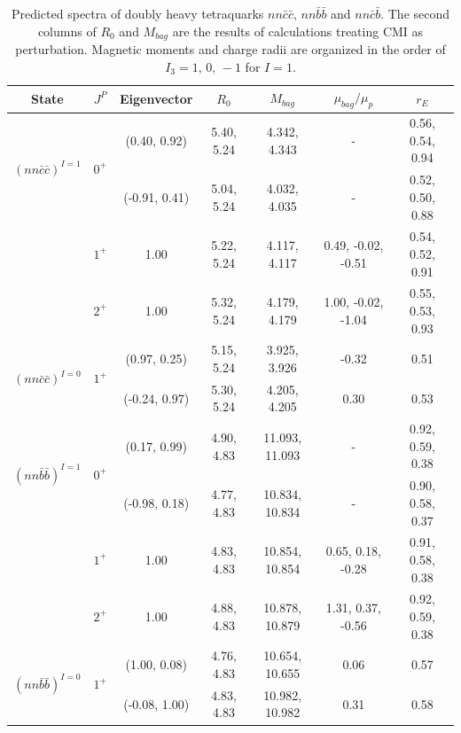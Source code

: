 \documentclass[prd,twocolumn,floatfix,nofootinbib]{revtex4}
\begin{document}
\renewcommand{\tabcolsep}{0.47cm}
\renewcommand{\arraystretch}{1.2}
\begin{table}[!htbp]
    \caption{Predicted spectra of doubly heavy tetraquarks $nn\bar{c}\bar{c}$, $nn\bar{b}\bar{b}$ and $nn\bar{c}\bar{b}$. 
    The second columns of $R_{0}$ and $M_{bag}$ are the results of calculations treating CMI as perturbation. 
    Magnetic moments and charge radii are organized in the order of $I_{3}=1,\,0,\,-1$ for $I=1$.}
    \label{tab:2heavytetraquark1}
    \begin{tabular}{ccccccc}
        \hline\hline
        {\rm State}     &$J^{P}$    &{\rm Eigenvector}      &$R_{0}$        &$M_{bag}$          &$\mu_{bag}/\mu_{p}$    &$r_{E}$ \\ \hline
        \multirow{2}{*}{${(nn\bar{c}\bar{c})}^{I=1}$}
                        &\multirow{2}{*}{$0^{+}$}
                                    &(0.40, 0.92)           &5.40, 5.24	    &4.342, 4.343	    &-                      &0.56, 0.54, 0.94 \\
                        &           &(-0.91, 0.41)          &5.04, 5.24	    &4.032, 4.035	    &-                      &0.52, 0.50, 0.88 \\
                        &$1^{+}$    &1.00                   &5.22, 5.24	    &4.117, 4.117	    &0.49, -0.02, -0.51     &0.54, 0.52, 0.91 \\
                        &$2^{+}$    &1.00                   &5.32, 5.24	    &4.179, 4.179	    &1.00, -0.02, -1.04     &0.55, 0.53, 0.93 \\
        \multirow{2}{*}{${(nn\bar{c}\bar{c})}^{I=0}$}
                        &\multirow{2}{*}{$1^{+}$}
                                    &(0.97, 0.25)           &5.15, 5.24	    &3.925, 3.926	    &-0.32                  &0.51 \\
                        &           &(-0.24, 0.97)          &5.30, 5.24	    &4.205, 4.205	    &0.30                   &0.53 \\
        \multirow{2}{*}{${(nn\bar{b}\bar{b})}^{I=1}$}
                        &\multirow{2}{*}{$0^{+}$}
                                    &(0.17, 0.99)           &4.90, 4.83	    &11.093, 11.093	    &-                      &0.92, 0.59, 0.38 \\
                        &           &(-0.98, 0.18)          &4.77, 4.83	    &10.834, 10.834	    &-                      &0.90, 0.58, 0.37 \\
                        &$1^{+}$    &1.00                   &4.83, 4.83	    &10.854, 10.854	    &0.65, 0.18, -0.28      &0.91, 0.58, 0.38 \\
                        &$2^{+}$    &1.00                   &4.88, 4.83	    &10.878, 10.879	    &1.31, 0.37, -0.56      &0.92, 0.59, 0.38 \\
        \multirow{2}{*}{${(nn\bar{b}\bar{b})}^{I=0}$}
                        &\multirow{2}{*}{$1^{+}$}
                                    &(1.00, 0.08)           &4.76, 4.83	    &10.654, 10.655	    &0.06                   &0.57 \\
                        &           &(-0.08, 1.00)          &4.83, 4.83	    &10.982, 10.982	    &0.31                   &0.58 \\


\end{tabular}
\end{table}
\end{document}
